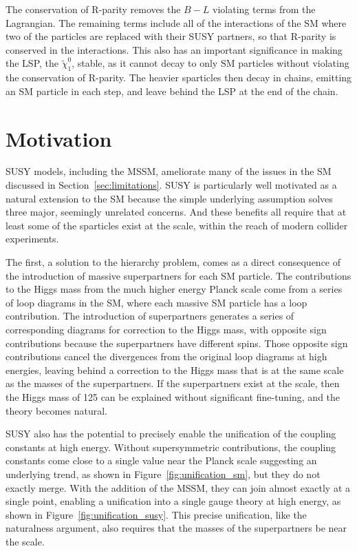 The conservation of R-parity removes the $B-L$ violating terms from the Lagrangian.
The remaining terms include all of the interactions of the \ac{SM} where two of the particles are replaced with their \ac{SUSY} partners, so that R-parity is conserved in the interactions.
This also has an important significance in making the \acf{LSP}, the $\tilde{\chi}_1^0$, stable, as it cannot decay to only \ac{SM} particles without violating the conservation of R-parity.
The heavier sparticles then decay in chains, emitting an \ac{SM} particle in each step, and leave behind the \ac{LSP} at the end of the chain.

\section{Motivation}

\ac{SUSY} models, including the \ac{MSSM}, ameliorate many of the issues in the \ac{SM} discussed in Section~\ref{sec:limitations}.
\ac{SUSY} is particularly well motivated as a natural extension to the \ac{SM} because the simple underlying assumption solves three major, seemingly unrelated concerns.
And these benefits all require that at least some of the sparticles exist at the \TeV scale, within the reach of modern collider experiments.

The first, a solution to the hierarchy problem, comes as a direct consequence of the introduction of massive superpartners for each \ac{SM} particle.
The contributions to the Higgs mass from the much higher energy Planck scale come from a series of loop diagrams in the \ac{SM}, where each massive \ac{SM} particle has a loop contribution.
The introduction of superpartners generates a series of corresponding diagrams for correction to the Higgs mass, with opposite sign contributions because the superpartners have different spins.
Those opposite sign contributions cancel the divergences from the original loop diagrams at high energies, leaving behind a correction to the Higgs mass that is at the same scale as the masses of the superpartners. 
If the superpartners exist at the \TeV scale, then the Higgs mass of 125 \GeV can be explained without significant fine-tuning, and the theory becomes natural.

\ac{SUSY} also has the potential to precisely enable the unification of the coupling constants at high energy.
Without supersymmetric contributions, the coupling constants come close to a single value near the Planck scale suggesting an underlying trend, as shown in Figure~\ref{fig:unification_sm}, but they do not exactly merge.
With the addition of the \ac{MSSM}, they can join almost exactly at a single point, enabling a unification into a single gauge theory at high energy, as shown in Figure~\ref{fig:unification_susy}. 
This precise unification, like the naturalness argument, also requires that the masses of the superpartners be near the \TeV scale.

